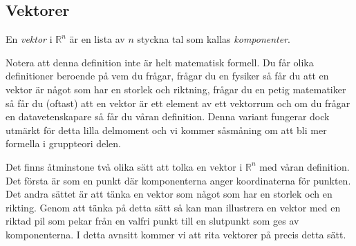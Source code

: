 \documentclass{article}
\theoremstyle{definition}
\begin{document}
\subsection{Vektorer}
\begin{mydef}{}{}
  En \textit{vektor} i $\mathbb{R}^n$ är en lista av $n$ styckna tal som kallas \textit{komponenter}. 
\end{mydef}
Notera att denna definition inte är helt matematisk formell. Du får olika definitioner beroende på vem du frågar, frågar du en fysiker så får du att en vektor
är något som har en storlek och riktning, frågar du en petig matematiker så får du (oftast) att en vektor är ett element av ett vektorrum och om du frågar en datavetenskapare så får du våran 
definition. Denna variant fungerar dock utmärkt för detta lilla delmoment och vi kommer såsmåning om att bli mer formella i gruppteori delen. 

Det finns åtminstone två olika sätt att tolka en vektor i $\mathbb{R}^n$ med våran definition. Det första är som en 
punkt där komponenterna anger koordinaterna för punkten. Det andra sättet är att tänka en vektor 
som något som har en storlek och en rikting. Genom att tänka på detta sätt så kan man illustrera en 
vektor med en riktad pil som pekar från en valfri punkt till en slutpunkt som ges av komponenterna.
I detta avnsitt kommer vi att rita vektorer på precis detta sätt. 
\end{document}
